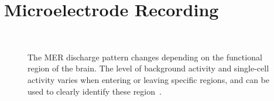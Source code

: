 \documentclass[journal]{vgtc}                %
\begin{document}
\section{Microelectrode Recording}\label{sec:mer}
\begin{figure}
    \centering
    \\
    \caption{The MER discharge pattern changes depending on the functional region of the brain. The level of background activity and single-cell activity varies when entering or leaving specific regions, and can be used to clearly identify these region~\cite{Benazzouz2002,Hutchison1998}.}
    \label{fig:dischargepatterns}
\end{figure}
\end{document}
